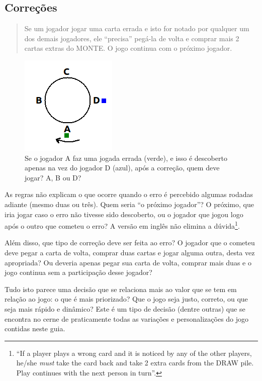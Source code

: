 \subsection{Correções}

\begin{quote}
Se um jogador jogar uma carta errada e isto for notado por qualquer um dos demais jogadores, ele ``precisa'' pegá-la de volta e comprar mais 2 cartas extras do MONTE. O jogo continua com o próximo jogador.
\end{quote}

\begin{figure}
  \begin{center}
    \includegraphics[scale=0.5]{fig1.png}
  \end{center}
  \caption{Se o jogador A faz uma jogada errada (verde), e isso é descoberto apenas na vez do jogador D (azul), após a correção, quem deve jogar? A, B ou D?}
\end{figure}

As regras não explicam o que ocorre quando o erro é percebido algumas rodadas adiante (mesmo duas ou três). Quem seria ``o próximo jogador''? O próximo, que iria jogar caso o erro não tivesse sido descoberto, ou o jogador que jogou logo após o outro que cometeu o erro? A versão em inglês não elimina a dúvida\footnote{``If a player plays a wrong card and it is noticed by any of the other players, he/she \emph{must} take the card back and take 2 extra cards from the DRAW pile. Play continues with the next person in turn''.}.

Além disso, que tipo de correção deve ser feita ao erro? O jogador que o cometeu deve pegar a carta de volta, comprar duas cartas e jogar alguma outra, desta vez apropriada? Ou deveria apenas pegar sua carta de volta, comprar mais duas e o jogo continua sem a participação desse jogador?

Tudo isto parece uma decisão que se relaciona mais ao valor que se tem em relação ao jogo: o que é mais priorizado? Que o jogo seja justo, correto, ou que seja mais rápido e dinâmico? Este é um tipo de decisão (dentre outras) que se encontra no cerne de praticamente todas as variações e personalizações do jogo contidas neste guia.

